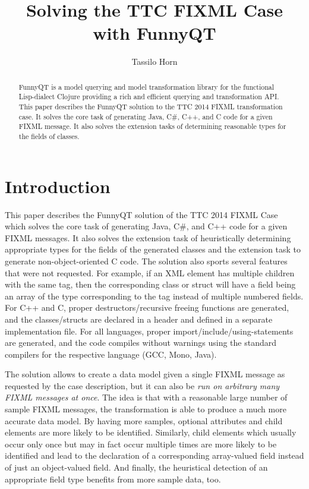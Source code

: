 \documentclass[submission]{eptcs}
\title{Solving the TTC FIXML Case with FunnyQT}
\author{Tassilo Horn
  \institute{Institute for Software Technology, University Koblenz-Landau, Germany}
  \email{horn@uni-koblenz.de}}
\begin{document}
\maketitle

\begin{abstract}
  FunnyQT is a model querying and model transformation library for the
  functional Lisp-dialect Clojure providing a rich and efficient querying and
  transformation API.  This paper describes the FunnyQT solution to the TTC
  2014 FIXML transformation case.  It solves the core task of generating Java,
  C\#, C++, and C code for a given FIXML message.  It also solves the extension
  tasks of determining reasonable types for the fields of classes.
\end{abstract}


\section{Introduction}
\label{sec:introduction}

This paper describes the FunnyQT solution of the TTC 2014 FIXML
Case~\cite{fixml-case-desc} which solves the core task of generating Java, C\#,
and C++ code for a given FIXML messages.  It also solves the extension task of
heuristically determining appropriate types for the fields of the generated
classes and the extension task to generate non-object-oriented C code.  The
solution also sports several features that were not requested.  For example, if
an XML element has multiple children with the same tag, then the corresponding
class or struct will have a field being an array of the type corresponding to
the tag instead of multiple numbered fields.  For C++ and C, proper
destructors/recursive freeing functions are generated, and the classes/structs
are declared in a header and defined in a separate implementation file.  For
all languages, proper import/include/using-statements are generated, and the
code compiles without warnings using the standard compilers for the respective
language (GCC, Mono, Java).

The solution allows to create a data model given a single FIXML message as
requested by the case description, but it can also be \emph{run on arbitrary
  many FIXML messages at once}.  The idea is that with a reasonable large
number of sample FIXML messages, the transformation is able to produce a much
more accurate data model.  By having more samples, optional attributes and
child elements are more likely to be identified.  Similarly, child elements
which usually occur only once but may in fact occur multiple times are more
likely to be identified and lead to the declaration of a corresponding
array-valued field instead of just an object-valued field.  And finally, the
heuristical detection of an appropriate field type benefits from more sample
data, too.
\end{document}
